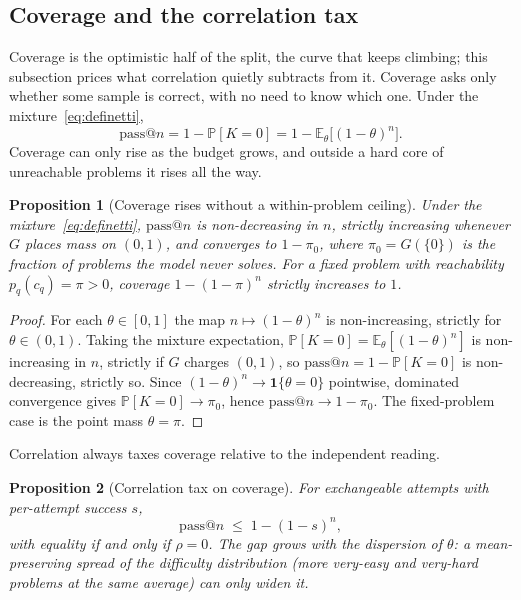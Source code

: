 \documentclass[11pt]{article}
\newtheorem{proposition}{Proposition}
\newcommand{\E}{\mathbb{E}}
\newcommand{\Prob}{\mathbb{P}}
\begin{document}
\subsection{Coverage and the correlation tax}
\label{sec:coverage}

Coverage is the optimistic half of the split, the curve that keeps climbing; this subsection prices what correlation quietly subtracts from it. Coverage asks only whether some sample is correct, with no need to know which one. Under the mixture~\eqref{eq:definetti},
\begin{equation}
\mathrm{pass}@n = 1 - \Prob[K=0] = 1 - \E_\theta\big[(1-\theta)^n\big].
\label{eq:coverage}
\end{equation}
Coverage can only rise as the budget grows, and outside a hard core of unreachable problems it rises all the way.

\begin{proposition}[Coverage rises without a within-problem ceiling]
\label{prop:cov_mono}
Under the mixture~\eqref{eq:definetti}, $\mathrm{pass}@n$ is non-decreasing in $n$, strictly increasing whenever $G$ places mass on $(0,1)$, and converges to $1-\pi_0$, where $\pi_0=G(\{0\})$ is the fraction of problems the model never solves. For a fixed problem with reachability $p_q(c_q)=\pi>0$, coverage $1-(1-\pi)^n$ strictly increases to $1$.
\end{proposition}

\begin{proof}
For each $\theta\in[0,1]$ the map $n\mapsto(1-\theta)^n$ is non-increasing, strictly for $\theta\in(0,1)$. Taking the mixture expectation, $\Prob[K=0]=\E_\theta[(1-\theta)^n]$ is non-increasing in $n$, strictly if $G$ charges $(0,1)$, so $\mathrm{pass}@n=1-\Prob[K=0]$ is non-decreasing, strictly so. Since $(1-\theta)^n\to\mathbf 1\{\theta=0\}$ pointwise, dominated convergence gives $\Prob[K=0]\to\pi_0$, hence $\mathrm{pass}@n\to1-\pi_0$. The fixed-problem case is the point mass $\theta=\pi$.
\end{proof}

Correlation always taxes coverage relative to the independent reading.

\begin{proposition}[Correlation tax on coverage]
\label{prop:tax}
For exchangeable attempts with per-attempt success $s$,
\begin{equation}
\mathrm{pass}@n \;\le\; 1 - (1-s)^n,
\label{eq:tax}
\end{equation}
with equality if and only if $\rho = 0$. The gap grows with the dispersion of $\theta$: a mean-preserving spread of the difficulty distribution (more very-easy and very-hard problems at the same average) can only widen it.
\end{proposition}
\end{document}
